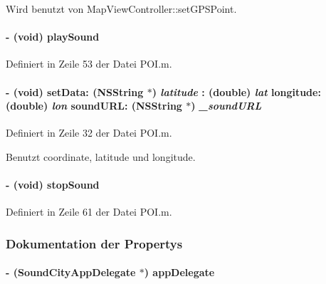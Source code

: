 Wird benutzt von MapViewController::setGPSPoint.\hypertarget{interface_p_o_i_a30959e0dbc986b8eb13751f937f48e71}{
\paragraph[{playSound}]{\setlength{\rightskip}{0pt plus 5cm}-\/ (void) playSound }\hfill}
\label{interface_p_o_i_a30959e0dbc986b8eb13751f937f48e71}


Definiert in Zeile 53 der Datei POI.m.\hypertarget{interface_p_o_i_a73115928aaa3772b6e482351d445494a}{
\paragraph[{setData::longitude:soundURL:}]{\setlength{\rightskip}{0pt plus 5cm}-\/ (void) setData: (NSString $\ast$) {\em latitude}\/ : (double) {\em lat}\/ longitude: (double) {\em lon}\/ soundURL: (NSString $\ast$) {\em \_\-soundURL}}\hfill}
\label{interface_p_o_i_a73115928aaa3772b6e482351d445494a}


Definiert in Zeile 32 der Datei POI.m.

Benutzt coordinate, latitude und longitude.\hypertarget{interface_p_o_i_aa569ca00c6e3ab1176a5279bbd986255}{
\paragraph[{stopSound}]{\setlength{\rightskip}{0pt plus 5cm}-\/ (void) stopSound }\hfill}
\label{interface_p_o_i_aa569ca00c6e3ab1176a5279bbd986255}


Definiert in Zeile 61 der Datei POI.m.

\subsubsection{Dokumentation der Propertys}
\hypertarget{interface_p_o_i_a9551f023faddf40afad4e8b9f5d87c77}{
\paragraph[{appDelegate}]{\setlength{\rightskip}{0pt plus 5cm}-\/ ({\bf SoundCityAppDelegate} $\ast$) appDelegate}\hfill}
\label{interface_p_o_i_a9551f023faddf40afad4e8b9f5d87c77}


